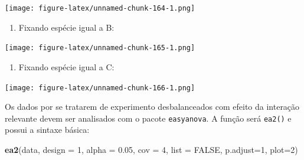 \documentclass[
]{article}
\newenvironment{Shaded}{\begin{snugshade}}{\end{snugshade}}
\newcommand{\DataTypeTok}[1]{\textcolor[rgb]{0.13,0.29,0.53}{#1}}
\newcommand{\DecValTok}[1]{\textcolor[rgb]{0.00,0.00,0.81}{#1}}
\newcommand{\FloatTok}[1]{\textcolor[rgb]{0.00,0.00,0.81}{#1}}
\newcommand{\KeywordTok}[1]{\textcolor[rgb]{0.13,0.29,0.53}{\textbf{#1}}}
\newcommand{\NormalTok}[1]{#1}
\newcommand{\OperatorTok}[1]{\textcolor[rgb]{0.81,0.36,0.00}{\textbf{#1}}}
\newcommand{\OtherTok}[1]{\textcolor[rgb]{0.56,0.35,0.01}{#1}}
\newcommand{\StringTok}[1]{\textcolor[rgb]{0.31,0.60,0.02}{#1}}
\providecommand{\tightlist}{%
  \setlength{\itemsep}{0pt}\setlength{\parskip}{0pt}}
\begin{document}
\begin{Shaded}
\end{Shaded}

\texttt{[image: figure-latex/unnamed-chunk-164-1.png]}

\begin{enumerate}
\def\labelenumi{\arabic{enumi}.}
\setcounter{enumi}{7}
\tightlist
\item
  Fixando espécie igual a B:
\end{enumerate}

\begin{Shaded}
\end{Shaded}

\texttt{[image: figure-latex/unnamed-chunk-165-1.png]}

\begin{enumerate}
\def\labelenumi{\arabic{enumi}.}
\setcounter{enumi}{8}
\tightlist
\item
  Fixando espécie igual a C:
\end{enumerate}

\begin{Shaded}
\end{Shaded}

\texttt{[image: figure-latex/unnamed-chunk-166-1.png]}

Os dados por se tratarem de experimento desbalanceados com efeito da interação relevante devem ser analisados com o pacote \texttt{easyanova}. A função será \texttt{ea2()} e possui a sintaxe básica:

\begin{Shaded}
\begin{Highlighting}[]
\KeywordTok{ea2}\NormalTok{(data, }\DataTypeTok{design =} \DecValTok{1}\NormalTok{, }\DataTypeTok{alpha =} \FloatTok{0.05}\NormalTok{, }\DataTypeTok{cov =} \DecValTok{4}\NormalTok{, }\DataTypeTok{list =} \OtherTok{FALSE}\NormalTok{, }
    \DataTypeTok{p.adjust=}\DecValTok{1}\NormalTok{, }\DataTypeTok{plot=}\DecValTok{2}\NormalTok{)}
\end{Highlighting}
\end{Shaded}
\end{document}
